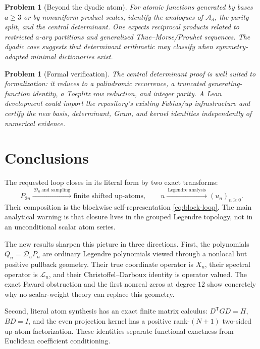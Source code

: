 \documentclass[11pt,oneside]{article}
\numberwithin{equation}{section}
\newtheorem{problem}[theorem]{Problem}
\theoremstyle{definition}
\theoremstyle{remark}
\newcommand{\Dscr}{\mathscr D_u}
\newcommand{\Lscr}{\mathscr L_u}
\begin{document}
\begin{problem}[Beyond the dyadic atom]
For atomic functions generated by bases $a\ge3$ or by nonuniform product
scales, identify the analogues of $\mathcal A_d$, the parity split, and the
central determinant.  One expects reciprocal products related to restricted
$a$-ary partitions and generalized Thue--Morse/Prouhet sequences.  The dyadic
case suggests that determinant arithmetic may classify when symmetry-adapted
minimal dictionaries exist.
\end{problem}

\begin{problem}[Formal verification]
The central determinant proof is well suited to formalization: it reduces to a
palindromic recurrence, a truncated generating-function identity, a Toeplitz
row reduction, and integer parity.  A Lean development could import the
repository's existing Fabius/up infrastructure and certify the new basis,
determinant, Gram, and kernel identities independently of numerical evidence.
\end{problem}

\section{Conclusions}
\label{sec:conclusion}

The requested loop closes in its literal form by two exact transforms:
\[
 P_{2n}\xrightarrow{\ \Dscr\ \text{and sampling}\ }
 \text{finite shifted up-atoms},
 \qquad
 u\xrightarrow{\ \text{Legendre analysis}\ }(u_n)_{n\ge0}.
\]
Their composition is the blockwise self-representation
\eqref{eq:block-loop}.  The main analytical warning is that closure lives in
the grouped Legendre topology, not in an unconditional scalar atom series.

The new results sharpen this picture in three directions.  First, the
polynomials $Q_n=\Dscr P_n$ are ordinary Legendre polynomials viewed through a
nonlocal but positive pullback geometry.  Their true coordinate operator is
$X_u$, their spectral operator is $\Lscr$, and their Christoffel--Darboux
identity is operator valued.  The exact Favard obstruction and the first
nonreal zeros at degree $12$ show concretely why no scalar-weight theory can
replace this geometry.

Second, literal atom synthesis has an exact finite matrix calculus:
$D^{\mathsf T}GD=H$, $BD=I$, and the even projection kernel has a positive
rank-$(N+1)$ two-sided up-atom factorization.  These identities separate
functional exactness from Euclidean coefficient conditioning.
\end{document}
